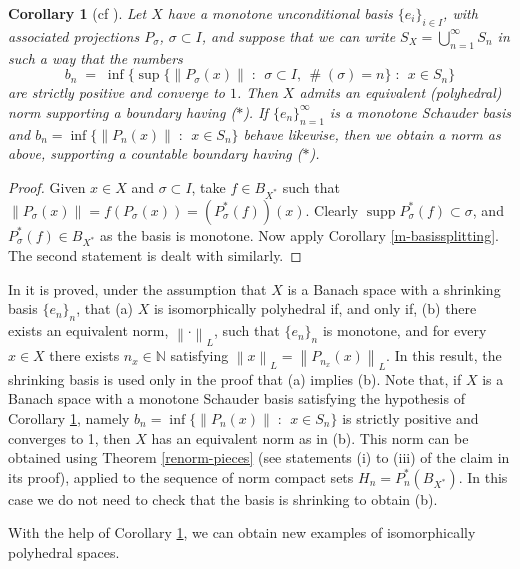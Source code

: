 \documentclass[12pt,a4paper]{amsart}
\newtheorem{corollary}[theorem]{Corollary}
\theoremstyle{definition}
\theoremstyle{remark}
\DeclareMathOperator{\card}{\#}
\DeclareMathOperator{\supp}{supp}
\newcommand{\n}[1]{\ensuremath{\left\|{#1}\right\|}}
\newcommand{\N}{\mathbb{N}}
\newcommand{\ndot}{\ensuremath{\left\|\cdot\right\|}}
\newcommand{\set}[2]{\{{#1} \;:\;\, {#2}\}}
\newcommand{\st}{($*$)}
\begin{document}
\begin{corollary}[cf {\cite[Theorem 24]{FPST}}]\label{uncbasissplitting}
Let $X$ have a monotone unconditional basis $\{e_i\}_{i \in I}$, with
associated projections $P_\sigma$, $\sigma \subset I$, and suppose
that we can write $S_X = \bigcup_{n=1}^\infty S_n$ in such a way that
the numbers
\[
b_n \;=\; \inf\set{\sup\set{\n{P_\sigma(x)}}{\sigma \subset I,\, \card(\sigma) = n}}{x \in S_n}
\]
are strictly positive and converge to $1$. Then $X$ admits an
equivalent (polyhedral) norm supporting a boundary having {\st}. If
$\{e_n\}_{n=1}^\infty$ is a monotone Schauder basis and
$b_n = \inf\set{\n{P_n(x)}}{x \in S_n}$ behave likewise, then we obtain
a norm as above, supporting a countable boundary having {\st}.
\end{corollary}

\begin{proof}
Given $x \in X$ and $\sigma \subset I$, take $f\in B_{X^*}$ such
that $\n{P_\sigma(x)} = f(P_\sigma(x)) = (P_\sigma^*(f))(x)$. Clearly
$\supp P_\sigma^*(f) \subset \sigma$, and $P_\sigma^*(f) \in B_{X^*}$
as the basis is monotone. Now apply Corollary \ref{m-basissplitting}. The second
statement is dealt with similarly.
\end{proof}

In \cite[Theorem 3]{leung} it is proved, under the assumption that
$X$ is a Banach space with a shrinking basis $\{e_n\}_n$, that (a)
$X$ is isomorphically polyhedral if, and only if, (b) there exists an
equivalent norm, $\ndot_L$, such that $\{e_n\}_n$ is monotone, and 
for every $x\in X$ there exists $n_x \in \N$ satisfying $\n{x}_L=\n{P_{n_x}(x)}_L$.
In this result, the shrinking basis is used only in the proof that
(a) implies (b). Note that, if $X$ is a Banach space with a monotone
Schauder basis satisfying the hypothesis of Corollary \ref{uncbasissplitting},
namely $b_n = \inf\set{\n{P_n(x)}}{x \in S_n}$ is strictly positive and
converges to 1, then $X$ has an equivalent norm as in (b). This norm
can be obtained using Theorem \ref{renorm-pieces} (see statements (i)
to (iii) of the claim in its proof), applied to the sequence of norm
compact sets $H_n=P_n^*(B_{X^*})$. In this case we do
not need to check that the basis is shrinking to obtain (b).

With the help of Corollary \ref{uncbasissplitting}, we can obtain new
examples of isomorphically polyhedral spaces.
\end{document}
